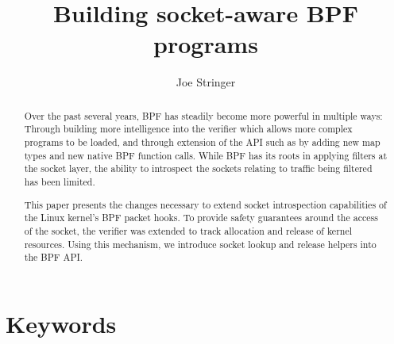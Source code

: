 \documentclass[10pt,sigconf,authorversion]{lpc}
\title{Building socket-aware BPF programs}
\author{Joe Stringer}
\affiliation{%
      \institution{Cilium.io}}
\begin{document}
\begin{abstract}

    Over the past several years, BPF has steadily become more powerful in
    multiple ways: Through building more intelligence into the verifier which
    allows more complex programs to be loaded, and through extension of the API
    such as by adding new map types and new native BPF function calls. While
    BPF has its roots in applying filters at the socket layer, the ability to
    introspect the sockets relating to traffic being filtered has been limited.

    This paper presents the changes necessary to extend socket introspection
    capabilities of the Linux kernel's BPF packet hooks. To provide safety
    guarantees around the access of the socket, the verifier was extended to
    track allocation and release of kernel resources. Using this mechanism, we
    introduce socket lookup and release helpers into the BPF API.




\end{abstract}

\maketitle

\section{Keywords}
\end{document}
